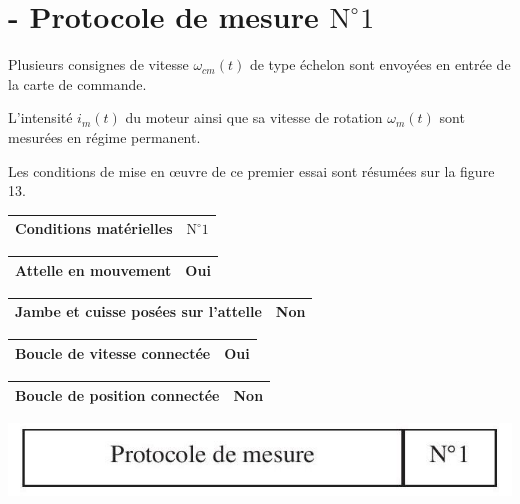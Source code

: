 \documentclass[10pt]{article}
\begin{document}
\section*{- Protocole de mesure $\mathrm{N}^{\circ} 1$}
Plusieurs consignes de vitesse $\omega_{c m}(t)$ de type échelon sont envoyées en entrée de la carte de commande.

L'intensité $i_{m}(t)$ du moteur ainsi que sa vitesse de rotation $\omega_{m}(t)$ sont mesurées en régime permanent.

Les conditions de mise en œuvre de ce premier essai sont résumées sur la figure 13.

\begin{center}
\begin{tabular}{|l|l|}
\hline
Conditions matérielles & $\mathrm{N}^{\circ} 1$ \\
\hline
\end{tabular}
\end{center}

\begin{center}
\begin{tabular}{|l|l|}
\hline
Attelle en mouvement & Oui \\
\hline
\end{tabular}
\end{center}

\begin{center}
\begin{tabular}{|l|l|}
\hline
Jambe et cuisse posées sur l'attelle & Non \\
\hline
\end{tabular}
\end{center}

\begin{center}
\begin{tabular}{|l|l|}
\hline
Boucle de vitesse connectée & Oui \\
\hline
\end{tabular}
\end{center}

\begin{center}
\begin{tabular}{|l|l|}
\hline
Boucle de position connectée & Non \\
\hline
\end{tabular}
\end{center}

\begin{center}
\includegraphics[max width=\textwidth]{2024_07_14_a83aebba33898893d39fg-09}
\end{center}
\end{document}
